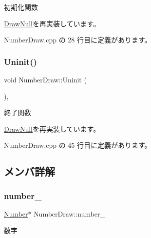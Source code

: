 初期化関数 



\mbox{\hyperlink{class_draw_null_a20aef1e54c1a158b741bfd731e18efdf}{Draw\+Null}}を再実装しています。



 Number\+Draw.\+cpp の 28 行目に定義があります。

\mbox{\label{class_number_draw_a2b203d101f23f0d3f584937ff5ad662a}} 
\subsubsection{\texorpdfstring{Uninit()}{Uninit()}}
{\footnotesize\ttfamily void Number\+Draw\+::\+Uninit (\begin{DoxyParamCaption}{ }\end{DoxyParamCaption})\hspace{0.3cm}{\ttfamily [override]}, {\ttfamily [virtual]}}



終了関数 



\mbox{\hyperlink{class_draw_null_a6e81d63efab7333e8d0e8af99362a4d9}{Draw\+Null}}を再実装しています。



 Number\+Draw.\+cpp の 45 行目に定義があります。



\subsection{メンバ詳解}
\mbox{\label{class_number_draw_a8063f58804542a7f86b341eec4cc1e60}} 
\subsubsection{\texorpdfstring{number\+\_\+}{number\_}}
{\footnotesize\ttfamily \mbox{\hyperlink{class_number}{Number}}$\ast$ Number\+Draw\+::number\+\_\+\hspace{0.3cm}{\ttfamily [private]}}



数字 



